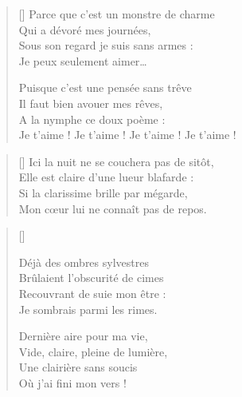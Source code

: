 
\settowidth{\versewidth}{Je t'aime ! Je t'aime ! Je t'aime ! Je t'aime !}
\begin{verse}[\versewidth]
Parce que c'est un monstre de charme \\
Qui a dévoré mes journées, \\
Sous son regard je suis sans armes : \\
Je peux seulement aimer…

Puisque c'est une pensée sans trêve \\
Il faut bien avouer mes rêves, \\
A la nymphe ce doux poème : \\
Je t'aime ! Je t'aime ! Je t'aime ! Je t'aime !
\end{verse}

\newpage

\settowidth{\versewidth}{Ici la nuit ne se couchera pas de sitôt,}
\begin{verse}[\versewidth]
Ici la nuit ne se couchera pas de sitôt, \\
Elle est claire d'une lueur blafarde : \\
Si la clarissime brille par mégarde, \\
Mon cœur lui ne connaît pas de repos.
\end{verse}


\settowidth{\versewidth}{Vide, claire, pleine de lumière,}
\begin{verse}[\versewidth]


Déjà des ombres sylvestres \\
Brûlaient l'obscurité de cimes \\
Recouvrant de suie mon être : \\
Je sombrais parmi les rimes.

Dernière aire pour ma vie, \\
Vide, claire, pleine de lumière, \\
Une clairière sans soucis \\
Où j'ai fini mon vers !
\end{verse}

